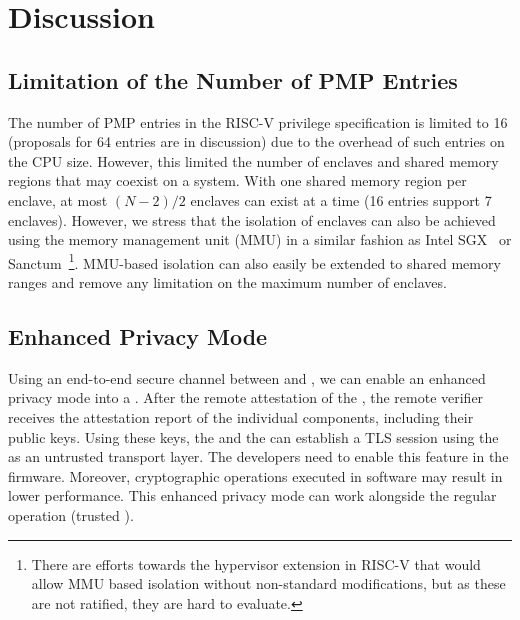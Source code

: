 \section{Discussion}
\label{sec:discussion}

\subsection{Limitation of the Number of PMP Entries} 
The number of PMP entries in the RISC-V privilege specification is limited to 16 (proposals for 64 entries are in discussion) due to the overhead of such entries on the CPU size. However, this limited the number of enclaves and shared memory regions that may coexist on a system. With one shared memory region per enclave, at most $(N-2)/2$ enclaves can exist at a time (16 entries support 7 enclaves). However, we stress that the isolation of enclaves can also be achieved using the memory management unit (MMU) in a similar fashion as Intel SGX~\cite{costan2016intel} or Sanctum~\cite{costan2016sanctum}\footnote{There are efforts towards the hypervisor extension in RISC-V that would allow MMU based isolation without non-standard modifications, but as these are not ratified, they are hard to evaluate.}. MMU-based isolation can also easily be extended to shared memory ranges and remove any limitation on the maximum number of enclaves. 


\subsection{Enhanced Privacy Mode} 
Using an end-to-end secure channel between \app and \sphw, we can enable an enhanced privacy mode into a \nameenclave. After the remote attestation of the \nameenclave, the remote verifier receives the attestation report of the individual components, including their public keys. Using these keys, the \app and the \sphw can establish a TLS session using the \ce as an untrusted transport layer. The developers need to enable this feature in the \sphw firmware. Moreover, cryptographic operations executed in software may result in lower performance. This enhanced privacy mode can work alongside the regular operation (trusted \ce). 